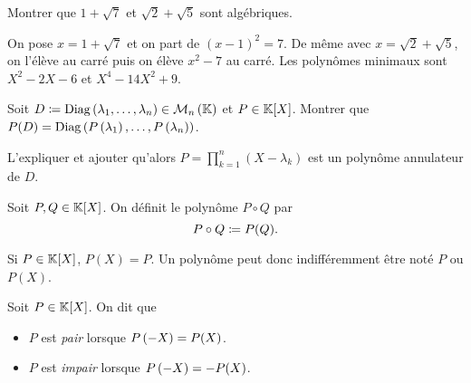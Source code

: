 \documentclass{magnolia}
\begin{document}
\begin{exoUnique}
\exo Montrer que $1+\sqrt{7}$ et $\sqrt{2}+\sqrt{5}$ sont algébriques.
  \begin{sol}
  On pose $x=1+\sqrt{7}$ et on part de $(x-1)^2=7$. De même avec $x=\sqrt{2}+\sqrt{5}$, on l'élève au carré puis on élève $x^2-7$ au carré.
  Les polynômes minimaux sont $X^2-2X-6$ et $X^4-14X^2+9$.
  \end{sol}
\exo Soit $D\coloneqq\mathop{\rm{Diag}}\left(\lambda_1,\ldots,\lambda_n\right)\in\mathcal{M}_{n}\left(\mathbb{K}\right)$ et $P\in\polyK$. Montrer que
  $P(D)=\mathop{\rm{Diag}}\left(P\left(\lambda_1\right),\ldots,P\left(\lambda_n\right)\right)$.  
  \begin{sol}
  L'expliquer et ajouter qu'alors $P=\prod_{k=1}^n(X-\lambda_k)$ est un polynôme annulateur de $D$.
  \end{sol}
\end{exoUnique}


\begin{definition}
Soit $P,Q\in\polyK$. On définit le polynôme $P\circ Q$ par
\[P\circ Q\coloneqq P(Q).\]  
\end{definition}

\begin{remarqueUnique}
\remarque Si $P\in\polyK$, $P(X)=P$. Un polynôme peut donc indifféremment
  être noté $P$ ou $P(X)$.
\end{remarqueUnique}



\begin{definition}
Soit $P\in\polyK$. On dit que
\begin{itemize}
\item $P$ est \emph{pair} lorsque $P\left(-X\right)=P(X)$.
\item $P$ est \emph{impair} lorsque $P\left(-X\right)=-P(X)$.
\end{itemize}
\end{definition}
\end{document}
